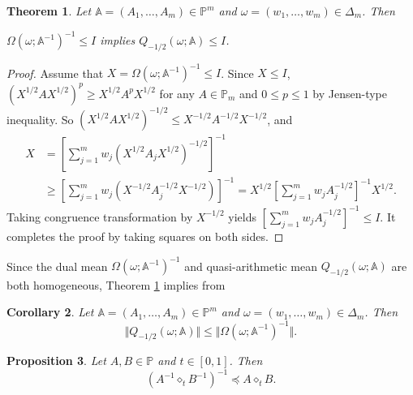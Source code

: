 \documentclass[12pt,reqno]{amsart}
\newtheorem{theorem}{Theorem}[section]
\newtheorem{corollary}[theorem]{Corollary}
\newtheorem{proposition}[theorem]{Proposition}
\begin{document}
\begin{theorem} \label{T:Dual-Q}
Let $\mathbb{A} = (A_{1}, \dots, A_{m}) \in \mathbb{P}^{m}$ and $\omega = (w_{1}, \dots, w_{m}) \in \Delta_{m}$. Then
\begin{center}
$\Omega(\omega; \mathbb{A}^{-1})^{-1} \leq I$ \quad implies \quad $Q_{-1/2}(\omega; \mathbb{A}) \leq I$.
\end{center}
\end{theorem}

\begin{proof}
Assume that $X = \Omega(\omega; \mathbb{A}^{-1})^{-1} \leq I$.
Since $X \leq I$, $(X^{1/2} A X^{1/2})^{p} \geq X^{1/2} A^{p} X^{1/2}$ for any $A \in \mathbb{P}_{m}$ and $0 \leq p \leq 1$ by Jensen-type inequality.
So $(X^{1/2} A X^{1/2})^{-1/2} \leq X^{-1/2} A^{-1/2} X^{-1/2}$, and
\begin{displaymath}
\begin{split}
X & = \left[ \sum_{j=1}^{m} w_{j} (X^{1/2} A_{j} X^{1/2})^{-1/2} \right]^{-1} \\
& \geq \left[ \sum_{j=1}^{m} w_{j} (X^{-1/2} A_{j}^{-1/2} X^{-1/2}) \right]^{-1} = X^{1/2} \left[ \sum_{j=1}^{m} w_{j} A_{j}^{-1/2} \right]^{-1} X^{1/2}.
\end{split}
\end{displaymath}
Taking congruence transformation by $X^{-1/2}$ yields $\displaystyle \left[ \sum_{j=1}^{m} w_{j} A_{j}^{-1/2} \right]^{-1} \leq I$. It completes the proof by taking squares on both sides.
\end{proof}

Since the dual mean $\Omega(\omega; \mathbb{A}^{-1})^{-1}$ and quasi-arithmetic mean $Q_{-1/2}(\omega; \mathbb{A})$ are both homogeneous, Theorem \ref{T:Dual-Q} implies from \cite[Lemma 2.2]{JK23}
\begin{corollary}
Let $\mathbb{A} = (A_{1}, \dots, A_{m}) \in \mathbb{P}^{m}$ and $\omega = (w_{1}, \dots, w_{m}) \in \Delta_{m}$. Then
\begin{displaymath}
\Vert Q_{-1/2}(\omega; \mathbb{A}) \Vert \leq \Vert \Omega(\omega; \mathbb{A}^{-1})^{-1} \Vert.
\end{displaymath}
\end{corollary}


\begin{proposition} \label{P:Wass-dual}
Let $A, B \in \mathbb{P}$ and $t \in [0,1]$. Then
\begin{displaymath}
(A^{-1} \diamond_{t} B^{-1})^{-1} \preceq A \diamond_{t} B.
\end{displaymath}
\end{proposition}
\end{document}
